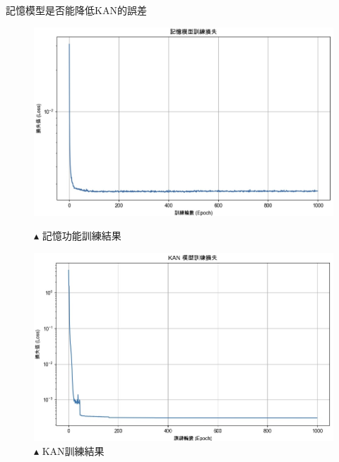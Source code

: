 \documentclass{beamer}
\begin{document}
\begin{frame}{記憶模型是否能降低KAN的誤差}
  \centering
  \begin{figure}
    \begin{minipage}{0.49\textwidth}
      \centering
      \includegraphics[width=\textwidth, keepaspectratio]{figures/記憶功能.jpg}
      \caption*{$\blacktriangle$ 記憶功能訓練結果}
    \end{minipage}%
    \hfill %
    \begin{minipage}{0.49\textwidth}
      \centering
      \includegraphics[width=\textwidth, keepaspectratio]{figures/kan_training_loss.jpeg}
      \caption*{$\blacktriangle$ KAN訓練結果}
    \end{minipage}
  \end{figure}
\end{frame}
\end{document}
